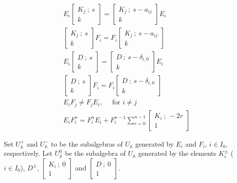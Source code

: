 \documentclass[12pt]{amsart}
\numberwithin{equation}{section}
\newcommand{\A}{\ensuremath{\mathbb{A}}}
\begin{document}
\begin{align*}
    E_i\begin{bmatrix} K_j \ ;\  s \\ k \end{bmatrix} = \begin{bmatrix} K_j \ ;\  s-a_{ij} \\ k \end{bmatrix}E_i \\
    \begin{bmatrix} K_j \ ;\  s \\ k \end{bmatrix}F_i = F_i \begin{bmatrix} K_j \ ;\  s-a_{ij} \\ k \end{bmatrix} \\
    E_i\begin{bmatrix} D \ ;\  s \\ k \end{bmatrix} = \begin{bmatrix} D \ ;\  s-\delta_{i,0} \\ k \end{bmatrix}E_i \\
    \begin{bmatrix} D \ ;\  s \\ k \end{bmatrix}F_i = F_i \begin{bmatrix} D \ ;\  s-\delta_{i,0} \\ k \end{bmatrix} \\
    E_iF_j \neq F_jE_i, \quad \mbox{ for } i\neq j\\
    E_iF_i^n = F_i^nE_i + F_i^{n-1}\sum_{r=0}^{n-1}\begin{bmatrix} K_i \ ;\  -2r \\ 1 \end{bmatrix}
\end{align*}

Set $U_{\A}^{+}$ and $U_{\A}^{-}$ to be the subalgebras of $U_{\A}$ generated by $E_i$ and $F_i$, $i\in I_0$, respectively. Let $U^0_{\A}$ be the subalgebra of $U_{\A}$ generated by the elements $K_i^{\pm}$ ($i\in I_0$), $D^{\pm}$, $\begin{bmatrix} K_i \ ;\  0 \\ 1 \end{bmatrix}$ and $\begin{bmatrix} D \ ;\  0 \\ 1 \end{bmatrix}$.   
\end{document}
